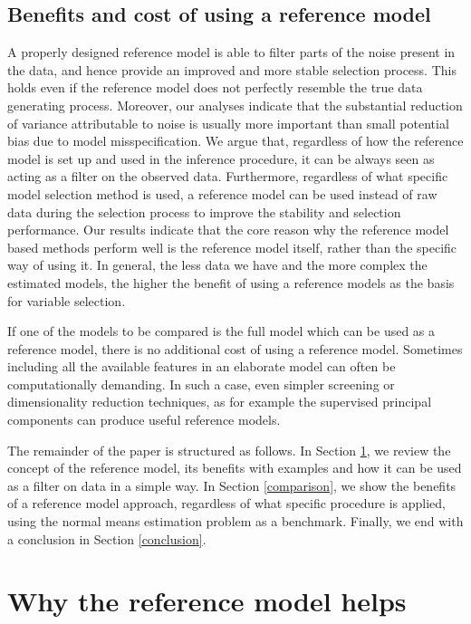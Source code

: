 \documentclass[american,]{article}
\theoremstyle{definition}
\begin{document}
\subsection{Benefits and cost of using a reference model}

A properly designed reference model is able to filter parts of the
noise present in the data, and hence provide an improved and more
stable selection process. This holds even if the reference model does
not perfectly resemble the true data generating process. Moreover, our
analyses indicate that the substantial reduction of variance
attributable to noise is usually more important than small potential
bias due to model misspecification.  We argue that, regardless of how
the reference model is set up and used in the inference procedure, it
can be always seen as acting as a filter on the observed
data. Furthermore, regardless of what specific model selection method
is used, a reference model can be used instead of raw data during the
selection process to improve the stability and selection
performance. Our results indicate that the core reason why the
reference model based methods perform well is the reference model
itself, rather than the specific way of using it.  In general, the
less data we have and the more complex the estimated models, the
higher the benefit of using a reference models as the basis for
variable selection.

If one of the models to be compared is the full model which can be
used as a reference model, there is no additional cost of using a
reference model. Sometimes including all the available features in an
elaborate model can often be computationally demanding.  In such a
case, even simpler screening or dimensionality reduction techniques,
as for example the supervised principal components
\citep{bair2006prediction,piironen2018} can produce useful reference
models.

The remainder of the paper is structured as follows. In Section
\ref{reference-model-approach}, we review the concept of the reference
model, its benefits with examples and how it can be used as a filter
on data in a simple way. In Section \ref{comparison}, we show the
benefits of a reference model approach, regardless of what specific
procedure is applied, using the normal means estimation problem as a
benchmark. Finally, we end with a conclusion in Section
\ref{conclusion}.


\hypertarget{reference-model-approach}{%
\section{Why the reference model helps}\label{reference-model-approach}}
 
\end{document}
